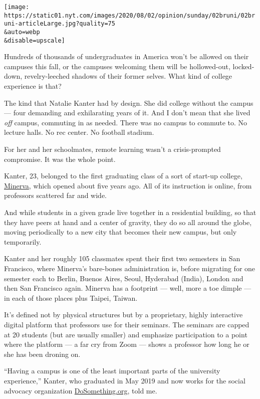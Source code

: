 \texttt{[image: https://static01.nyt.com/images/2020/08/02/opinion/sunday/02bruni/02bruni-articleLarge.jpg?quality=75\\\&auto=webp\\\&disable=upscale]}

Hundreds of thousands of undergraduates in America won't be allowed on
their campuses this fall, or the campuses welcoming them will be
hollowed-out, locked-down, revelry-leeched shadows of their former
selves. What kind of college experience is that?

The kind that Natalie Kanter had by design. She did college without the
campus --- four demanding and exhilarating years of it. And I don't mean
that she lived \emph{off} campus, commuting in as needed. There was no
campus to commute to. No lecture halls. No rec center. No football
stadium.

For her and her schoolmates, remote learning wasn't a crisis-prompted
compromise. It was the whole point.

Kanter, 23, belonged to the first graduating class of a sort of start-up
college,
\href{https://www.minervaproject.com/solutions/educational-solutions/}{Minerva},
which opened about five years ago. All of its instruction is online,
from professors scattered far and wide.

And while students in a given grade live together in a residential
building, so that they have peers at hand and a center of gravity, they
do so all around the globe, moving periodically to a new city that
becomes their new campus, but only temporarily.

Kanter and her roughly 105 classmates spent their first two semesters in
San Francisco, where Minerva's bare-bones administration is, before
migrating for one semester each to Berlin, Buenos Aires, Seoul,
Hyderabad (India), London and then San Francisco again. Minerva has a
footprint --- well, more a toe dimple --- in each of those places plus
Taipei, Taiwan.

It's defined not by physical structures but by a proprietary, highly
interactive digital platform that professors use for their seminars. The
seminars are capped at 20 students (but are usually smaller) and
emphasize participation to a point where the platform --- a far cry from
Zoom --- shows a professor how long he or she has been droning on.

``Having a campus is one of the least important parts of the university
experience,'' Kanter, who graduated in May 2019 and now works for the
social advocacy organization
\href{https://www.dosomething.org/us}{DoSomething.org}, told me.

